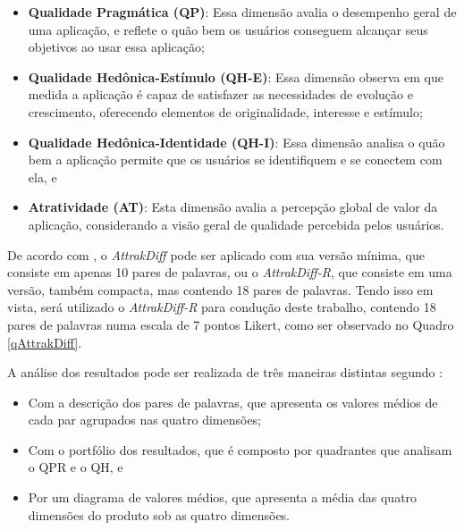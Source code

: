 \begin{itemize}
    \item \textbf{Qualidade Pragmática (QP)}: Essa dimensão avalia o desempenho geral de uma aplicação, e reflete o quão bem os usuários conseguem alcançar seus objetivos ao usar essa aplicação;
    \item \textbf{Qualidade Hedônica-Estímulo (QH-E)}: Essa dimensão observa em que medida a aplicação é capaz de satisfazer as necessidades de evolução e crescimento, oferecendo elementos de originalidade, interesse e estímulo;
    \item \textbf{Qualidade Hedônica-Identidade (QH-I)}: Essa dimensão analisa o quão bem a aplicação permite que os usuários se identifiquem e se conectem com ela, e
    \item \textbf{Atratividade (AT)}: Esta dimensão avalia a percepção global de valor da aplicação, considerando a visão geral de qualidade percebida pelos usuários.
\end{itemize}

De acordo com , o \textit{AttrakDiff} pode ser aplicado com sua versão mínima, que consiste em apenas 10 pares de palavras, ou o \textit{AttrakDiff-R}, que consiste em uma versão, também compacta, mas contendo 18 pares de palavras. Tendo isso em vista, será utilizado o \textit{AttrakDiff-R} para condução deste trabalho, contendo 18 pares de palavras numa escala de 7 pontos Likert, como ser observado no Quadro \ref{qAttrakDiff}.

A análise dos resultados pode ser realizada de três maneiras distintas segundo :

\begin{itemize}
    \item Com a descrição dos pares de palavras, que apresenta os valores médios de cada par agrupados nas quatro dimensões;
    \item Com o portfólio dos resultados, que é composto por quadrantes que analisam o QPR e o QH, e
    \item Por um diagrama de valores médios, que apresenta a média das quatro dimensões do produto sob as quatro dimensões.
\end{itemize}

